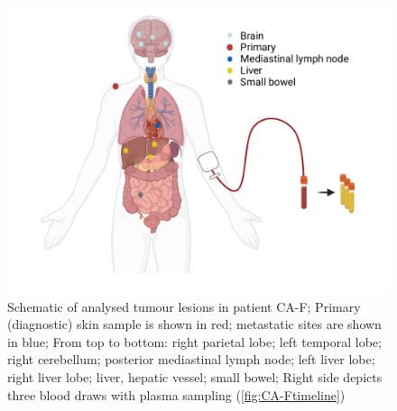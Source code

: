 \begin{figure}[!ht]
\centering
\includegraphics[width=.99\linewidth]{Figures/jointVariantCalling/CA-F_schematic_organColours}
\caption[Schematic of analysed tumour lesions in patient CA-F]{Schematic of analysed tumour lesions in patient CA-F; Primary (diagnostic) skin sample is shown in red; metastatic sites are shown in blue; From top to bottom: right parietal lobe; left temporal lobe; right cerebellum; posterior mediastinal lymph node; left liver lobe; right liver lobe; liver, hepatic vessel; small bowel; Right side depicts three blood draws with plasma sampling (\protect\autoref{fig:CA-Ftimeline})}\label{fig:CA-Fschematic}
\end{figure}


\fancyhead[RO,LE]{\leftmark}
\fancyhead[RE,LO]{\rightmark}
